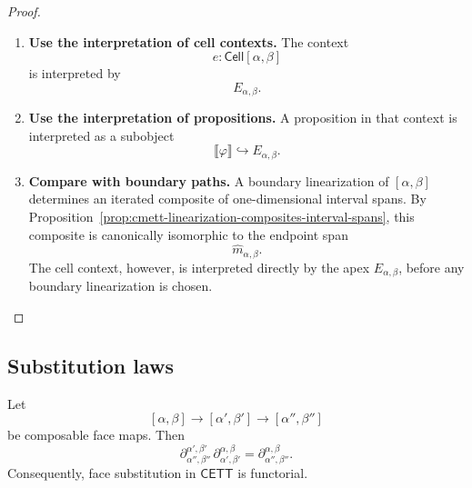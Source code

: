 \begin{proof}
    \leavevmode
    \begin{enumerate}
        \item \textbf{Use the interpretation of cell contexts.}
        The context
        \[
            e:\mathsf{Cell}[\alpha,\beta]
        \]
        is interpreted by
        \[
            E_{\alpha,\beta}.
        \]

        \item \textbf{Use the interpretation of propositions.}
        A proposition in that context is interpreted as a subobject
        \[
            \llbracket\varphi\rrbracket\hookrightarrow E_{\alpha,\beta}.
        \]

        \item \textbf{Compare with boundary paths.}
        A boundary linearization of \([\alpha,\beta]\) determines an iterated
        composite of one-dimensional interval spans. By
        Proposition~\ref{prop:cmett-linearization-composites-interval-spans},
        this composite is canonically isomorphic to the endpoint span
        \[
            \widehat m_{\alpha,\beta}.
        \]
        The cell context, however, is interpreted directly by the apex
        \(E_{\alpha,\beta}\), before any boundary linearization is chosen.
    \end{enumerate}
\end{proof}

\subsection{Substitution laws}
\label{subsec:cmett-substitution-laws}

\begin{proposition}
\label{prop:cmett-face-substitution-law}
    Let
    \[
        [\alpha,\beta]\to[\alpha',\beta']\to[\alpha'',\beta'']
    \]
    be composable face maps. Then
    \[
        \partial_{\alpha'',\beta''}^{\alpha',\beta'}
        \,
        \partial_{\alpha',\beta'}^{\alpha,\beta}
        =
        \partial_{\alpha'',\beta''}^{\alpha,\beta}.
    \]
    Consequently, face substitution in \(\mathsf{CETT}\) is functorial.
\end{proposition}

